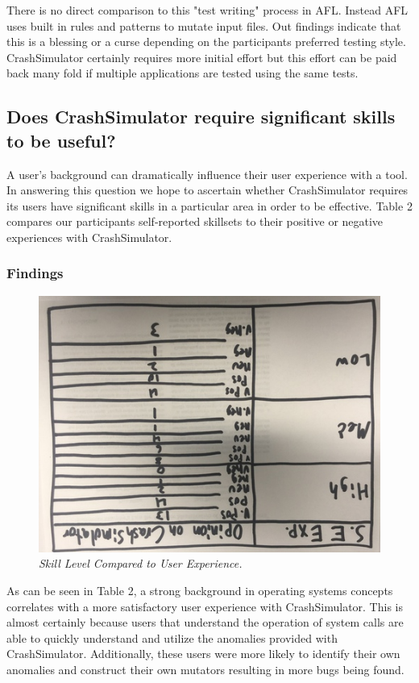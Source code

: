 There is no direct comparison to this "test writing" process in AFL.
Instead AFL uses built in rules and patterns to mutate input files.  Out
findings indicate that this is a blessing or a curse depending on the
participants preferred testing style.  CrashSimulator certainly requires
more initial effort but this effort can be paid back many fold if multiple
applications are tested using the same tests.


\subsection{Does CrashSimulator require significant skills to be useful?}

A user's background can dramatically influence their user experience with a
tool.  In answering this question we hope to ascertain whether
CrashSimulator requires its users have significant skills in a particular
area in order to be effective.  Table 2 compares our participants
self-reported skillsets to their positive or negative experiences with
CrashSimulator.


\subsubsection{Findings}

\begin{figure}[t]
  \center{}
  \includegraphics[scale=.5]{images/table2}
  \caption{\emph{Skill Level Compared to User Experience.}}
  \label{fig-skill-exp}
\end{figure}

As can be seen in Table 2, a strong background in operating systems
concepts correlates with a more satisfactory user experience with
CrashSimulator.  This is almost certainly because users that understand the
operation of system calls are able to quickly understand and utilize the
anomalies provided with CrashSimulator.  Additionally, these users were
more likely to identify their own anomalies and construct their own
mutators resulting in more bugs being found.

